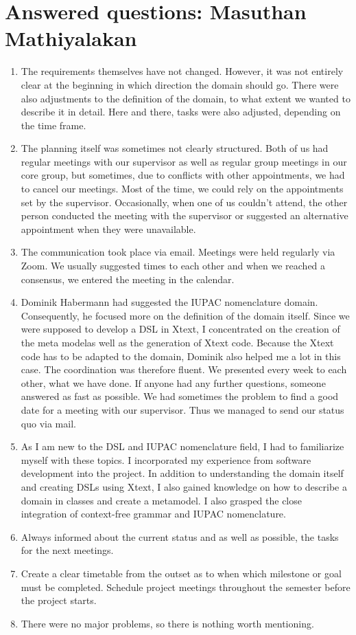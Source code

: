 \documentclass[
fontsize=11pt,
paper=a4,
abstract=true,
numbers=noenddot,
listof=totoc,
bibliography=totoc,
twoside,
open=right,
cleardoublepage=plain,
parskip=half+, %
BCOR=1cm, %
]{scrreprt}
\newcommand{\metamodel}{meta model}
\begin{document}
\section{Answered questions: Masuthan Mathiyalakan}\label{ss:AnsweredQuestionsMasuthanMathiyalakan}
\begin{enumerate}
    \item The requirements themselves have not changed. However, it was not entirely clear at the beginning in which direction the domain should go. There were also adjustments to the definition of the domain, to what extent we wanted to describe it in detail. Here and there, tasks were also adjusted, depending on the time frame.    
    \item The planning itself was sometimes not clearly structured. Both of us had regular meetings with our supervisor as well as regular group meetings in our core group, but sometimes, due to conflicts with other appointments, we had to cancel our meetings. Most of the time, we could rely on the appointments set by the supervisor. Occasionally, when one of us couldn't attend, the other person conducted the meeting with the supervisor or suggested an alternative appointment when they were unavailable. 
    \item The communication took place via email. Meetings were held regularly via Zoom. We usually suggested times to each other and when we reached a consensus, we entered the meeting in the calendar.  
    \item Dominik Habermann had suggested the IUPAC nomenclature domain. Consequently, he focused more on the definition of the domain itself. Since we were supposed to develop a DSL in Xtext, I concentrated on the creation of the \metamodel as well as the generation of Xtext code. Because the Xtext code has to be adapted to the domain, Dominik also helped me a lot in this case. The coordination was therefore fluent. We presented every week to each other, what we have done. If anyone had any further questions, someone answered as fast as possible. We had sometimes the problem to find a good date for a meeting with our supervisor. Thus we managed to send our status quo via mail.   
    \item As I am new to the DSL and IUPAC nomenclature field, I had to familiarize myself with these topics. I incorporated my experience from software development into the project. In addition to understanding the domain itself and creating DSLs using Xtext, I also gained knowledge on how to describe a domain in classes and create a metamodel. I also grasped the close integration of context-free grammar and IUPAC nomenclature.
    \item Always informed about the current status and as well as possible, the tasks for the next meetings. 
    \item Create a clear timetable from the outset as to when which milestone or goal must be completed. Schedule project meetings throughout the semester before the project starts. 
    \item There were no major problems, so there is nothing worth mentioning. 
\end{enumerate}
\end{document}
